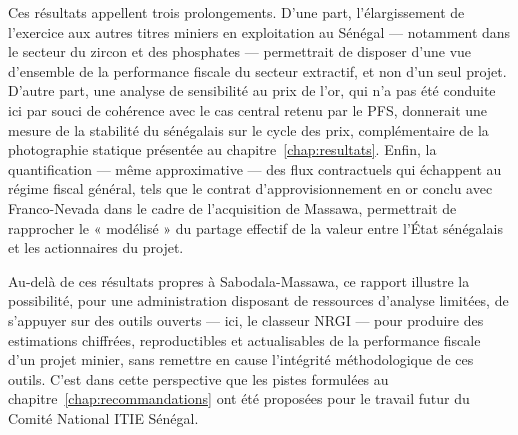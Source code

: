 Ces résultats appellent trois prolongements. D'une part, l'élargissement de l'exercice aux autres titres miniers en exploitation au Sénégal --- notamment dans le secteur du zircon et des phosphates --- permettrait de disposer d'une vue d'ensemble de la performance fiscale du secteur extractif, et non d'un seul projet. D'autre part, une analyse de sensibilité au prix de l'or, qui n'a pas été conduite ici par souci de cohérence avec le cas central retenu par le PFS, donnerait une mesure de la stabilité du \TEMI{} sénégalais sur le cycle des prix, complémentaire de la photographie statique présentée au chapitre~\ref{chap:resultats}. Enfin, la quantification --- même approximative --- des flux contractuels qui échappent au régime fiscal général, tels que le contrat d'approvisionnement en or conclu avec Franco-Nevada dans le cadre de l'acquisition de Massawa, permettrait de rapprocher le \TEMI{} « modélisé » du partage effectif de la valeur entre l'État sénégalais et les actionnaires du projet.

Au-delà de ces résultats propres à Sabodala-Massawa, ce rapport illustre la possibilité, pour une administration disposant de ressources d'analyse limitées, de s'appuyer sur des outils ouverts --- ici, le classeur NRGI --- pour produire des estimations chiffrées, reproductibles et actualisables de la performance fiscale d'un projet minier, sans remettre en cause l'intégrité méthodologique de ces outils. C'est dans cette perspective que les pistes formulées au chapitre~\ref{chap:recommandations} ont été proposées pour le travail futur du Comité National ITIE Sénégal.
